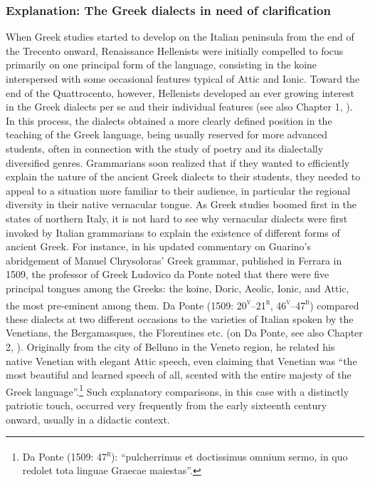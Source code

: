 \subsubsection{Explanation: The Greek dialects in need of clarification}
\hypertarget{Toc19704859}{}
When Greek studies started to develop on the Italian peninsula from the end of the Trecento onward, Renaissance Hellenists were initially compelled to focus primarily on one principal form of the language, consisting in the koine interspersed with some occasional features typical of Attic and Ionic. Toward the end of the Quattrocento, however, Hellenists developed an ever growing interest in the Greek dialects per se and their individual features (see also Chapter 1, ). In this process, the dialects obtained a more clearly defined position in the teaching of the Greek language, being usually reserved for more advanced students, often in connection with the study of poetry and its dialectally diversified genres. Grammarians soon realized that if they wanted to efficiently explain the nature of the ancient Greek dialects to their students, they needed to appeal to a situation more familiar to their audience, in particular the regional diversity in their native vernacular tongue. As Greek studies boomed first in the states of northern Italy, it is not hard to see why vernacular dialects were first invoked by Italian grammarians to explain the existence of different forms of ancient Greek. For instance, in his updated commentary on Guarino’s abridgement of Manuel Chrysoloras’ Greek grammar, published in Ferrara in 1509, the professor of Greek Ludovico da Ponte noted that there were five principal tongues among the Greeks: the koine, Doric, Aeolic, Ionic, and Attic, the most pre-eminent among them. Da Ponte (1509: 20\textsc{\textsuperscript{v}}–21\textsc{\textsuperscript{r}}, 46\textsc{\textsuperscript{v}}–47\textsc{\textsuperscript{r}}) compared these dialects at two different occasions to the varieties of Italian spoken by the Venetians, the Bergamasques, the Florentines etc. (on Da Ponte, see also Chapter 2, ). Originally from the city of Belluno in the Veneto region, he related his native Venetian with elegant Attic speech, even claiming that Venetian was “the most beautiful and learned speech of all, scented with the entire majesty of the Greek language”.\footnote{Da Ponte (1509: 47\textsc{\textsuperscript{r}}): “pulcherrimus et doctissimus omnium sermo, in quo redolet tota linguae Graecae maiestas”.} Such explanatory comparisons, in this case with a distinctly patriotic touch, occurred very frequently from the early sixteenth century onward, usually in a didactic context.


